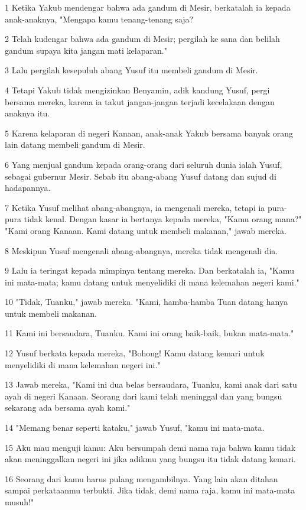 \par 1 Ketika Yakub mendengar bahwa ada gandum di Mesir, berkatalah ia kepada anak-anaknya, "Mengapa kamu tenang-tenang saja?
\par 2 Telah kudengar bahwa ada gandum di Mesir; pergilah ke sana dan belilah gandum supaya kita jangan mati kelaparan."
\par 3 Lalu pergilah kesepuluh abang Yusuf itu membeli gandum di Mesir.
\par 4 Tetapi Yakub tidak mengizinkan Benyamin, adik kandung Yusuf, pergi bersama mereka, karena ia takut jangan-jangan terjadi kecelakaan dengan anaknya itu.
\par 5 Karena kelaparan di negeri Kanaan, anak-anak Yakub bersama banyak orang lain datang membeli gandum di Mesir.
\par 6 Yang menjual gandum kepada orang-orang dari seluruh dunia ialah Yusuf, sebagai gubernur Mesir. Sebab itu abang-abang Yusuf datang dan sujud di hadapannya.
\par 7 Ketika Yusuf melihat abang-abangnya, ia mengenali mereka, tetapi ia pura-pura tidak kenal. Dengan kasar ia bertanya kepada mereka, "Kamu orang mana?" "Kami orang Kanaan. Kami datang untuk membeli makanan," jawab mereka.
\par 8 Meskipun Yusuf mengenali abang-abangnya, mereka tidak mengenali dia.
\par 9 Lalu ia teringat kepada mimpinya tentang mereka. Dan berkatalah ia, "Kamu ini mata-mata; kamu datang untuk menyelidiki di mana kelemahan negeri kami."
\par 10 "Tidak, Tuanku," jawab mereka. "Kami, hamba-hamba Tuan datang hanya untuk membeli makanan.
\par 11 Kami ini bersaudara, Tuanku. Kami ini orang baik-baik, bukan mata-mata."
\par 12 Yusuf berkata kepada mereka, "Bohong! Kamu datang kemari untuk menyelidiki di mana kelemahan negeri ini."
\par 13 Jawab mereka, "Kami ini dua belas bersaudara, Tuanku, kami anak dari satu ayah di negeri Kanaan. Seorang dari kami telah meninggal dan yang bungsu sekarang ada bersama ayah kami."
\par 14 "Memang benar seperti kataku," jawab Yusuf, "kamu ini mata-mata.
\par 15 Aku mau menguji kamu: Aku bersumpah demi nama raja bahwa kamu tidak akan meninggalkan negeri ini jika adikmu yang bungsu itu tidak datang kemari.
\par 16 Seorang dari kamu harus pulang mengambilnya. Yang lain akan ditahan sampai perkataanmu terbukti. Jika tidak, demi nama raja, kamu ini mata-mata musuh!"
